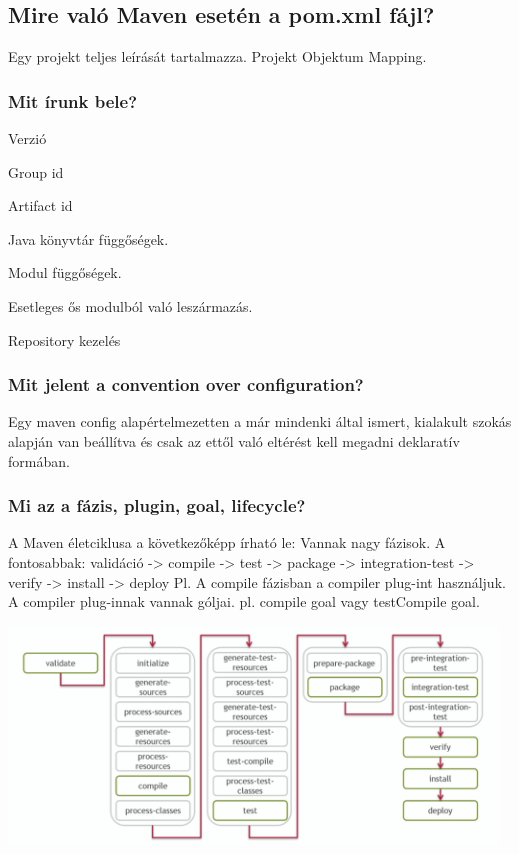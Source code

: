 \documentclass[a4paper,14pt]{extarticle}
\begin{document}
		\subsection{Mire való Maven esetén a pom.xml fájl?}
			Egy projekt teljes leírását tartalmazza.
			Projekt Objektum Mapping.
			\subsubsection{Mit írunk bele?}
			\begin{compactitem}
				\item Verzió
				\item Group id
				\item Artifact id
				\item Java könyvtár függőségek.
				\item Modul függőségek.
				\item Esetleges ős modulból való leszármazás.
				\item Repository kezelés
			\end{compactitem} 
			\subsubsection{Mit jelent a convention over configuration?}
				Egy maven config alapértelmezetten a már mindenki által ismert, kialakult szokás alapján van beállítva és csak az ettől való eltérést kell megadni deklaratív formában.
			\subsubsection{Mi az a fázis, plugin, goal, lifecycle?}
				A Maven életciklusa a következőképp írható le: \newline
				Vannak nagy fázisok. A fontosabbak: validáció -> compile -> test -> package -> integration-test -> verify -> install -> deploy
				Pl. A compile fázisban a compiler plug-int használjuk. A compiler plug-innak vannak góljai. pl. compile goal vagy testCompile goal. 
				\begin{center}
					\includegraphics[width=13cm]{mavenlifecycle}
				\end{center}
	
\end{document}
